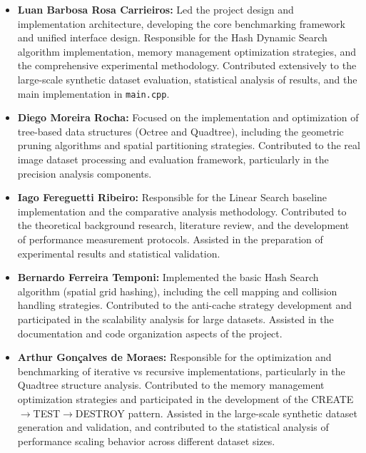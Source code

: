 \documentclass{sbc2023}
\begin{document}
\begin{itemize}
    \item \textbf{Luan Barbosa Rosa Carrieiros:} Led the project design and implementation architecture, developing the core benchmarking framework and unified interface design. Responsible for the Hash Dynamic Search algorithm implementation, memory management optimization strategies, and the comprehensive experimental methodology. Contributed extensively to the large-scale synthetic dataset evaluation, statistical analysis of results, and the main implementation in \texttt{main.cpp}.
    
    \item \textbf{Diego Moreira Rocha:} Focused on the implementation and optimization of tree-based data structures (Octree and Quadtree), including the geometric pruning algorithms and spatial partitioning strategies. Contributed to the real image dataset processing and evaluation framework, particularly in the precision analysis components.
    
    \item \textbf{Iago Fereguetti Ribeiro:} Responsible for the Linear Search baseline implementation and the comparative analysis methodology. Contributed to the theoretical background research, literature review, and the development of performance measurement protocols. Assisted in the preparation of experimental results and statistical validation.
    
    \item \textbf{Bernardo Ferreira Temponi:} Implemented the basic Hash Search algorithm (spatial grid hashing), including the cell mapping and collision handling strategies. Contributed to the anti-cache strategy development and participated in the scalability analysis for large datasets. Assisted in the documentation and code organization aspects of the project.
    
    \item \textbf{Arthur Gonçalves de Moraes:} Responsible for the optimization and benchmarking of iterative vs recursive implementations, particularly in the Quadtree structure analysis. Contributed to the memory management optimization strategies and participated in the development of the CREATE$\rightarrow$TEST$\rightarrow$DESTROY pattern. Assisted in the large-scale synthetic dataset generation and validation, and contributed to the statistical analysis of performance scaling behavior across different dataset sizes.
\end{itemize}
\end{document}
